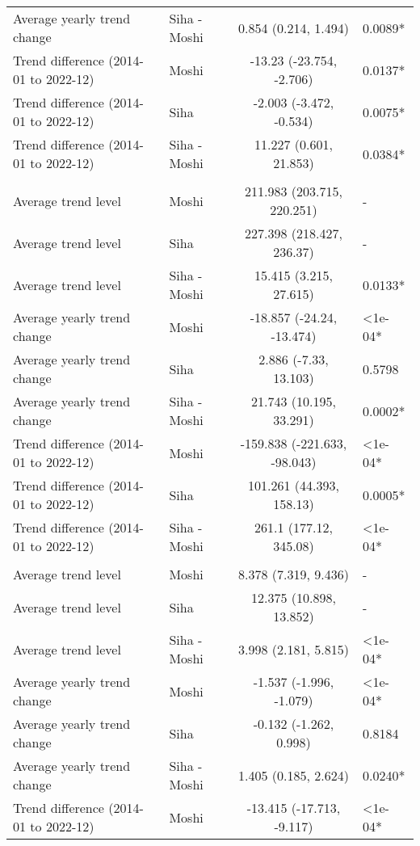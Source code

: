 \begin{longtable}{l|lcl}
Average yearly trend change & Siha - Moshi & 0.854 (0.214, 1.494) & 0.0089* \\ 
Trend difference (2014-01 to 2022-12) & Moshi & -13.23 (-23.754, -2.706) & 0.0137* \\ 
Trend difference (2014-01 to 2022-12) & Siha & -2.003 (-3.472, -0.534) & 0.0075* \\ 
Trend difference (2014-01 to 2022-12) & Siha - Moshi & 11.227 (0.601, 21.853) & 0.0384* \\ 
\midrule\addlinespace[2.5pt]
\multicolumn{4}{l}{Skin Infection - Fungal} \\ 
\midrule\addlinespace[2.5pt]
Average trend level & Moshi & 211.983 (203.715, 220.251) & - \\ 
Average trend level & Siha & 227.398 (218.427, 236.37) & - \\ 
Average trend level & Siha - Moshi & 15.415 (3.215, 27.615) & 0.0133* \\ 
Average yearly trend change & Moshi & -18.857 (-24.24, -13.474) & <1e-04* \\ 
Average yearly trend change & Siha & 2.886 (-7.33, 13.103) & 0.5798 \\ 
Average yearly trend change & Siha - Moshi & 21.743 (10.195, 33.291) & 0.0002* \\ 
Trend difference (2014-01 to 2022-12) & Moshi & -159.838 (-221.633, -98.043) & <1e-04* \\ 
Trend difference (2014-01 to 2022-12) & Siha & 101.261 (44.393, 158.13) & 0.0005* \\ 
Trend difference (2014-01 to 2022-12) & Siha - Moshi & 261.1 (177.12, 345.08) & <1e-04* \\ 
\midrule\addlinespace[2.5pt]
\multicolumn{4}{l}{Snake and Insect Bites} \\ 
\midrule\addlinespace[2.5pt]
Average trend level & Moshi & 8.378 (7.319, 9.436) & - \\ 
Average trend level & Siha & 12.375 (10.898, 13.852) & - \\ 
Average trend level & Siha - Moshi & 3.998 (2.181, 5.815) & <1e-04* \\ 
Average yearly trend change & Moshi & -1.537 (-1.996, -1.079) & <1e-04* \\ 
Average yearly trend change & Siha & -0.132 (-1.262, 0.998) & 0.8184 \\ 
Average yearly trend change & Siha - Moshi & 1.405 (0.185, 2.624) & 0.0240* \\ 
Trend difference (2014-01 to 2022-12) & Moshi & -13.415 (-17.713, -9.117) & <1e-04* \\ 

\end{longtable}
